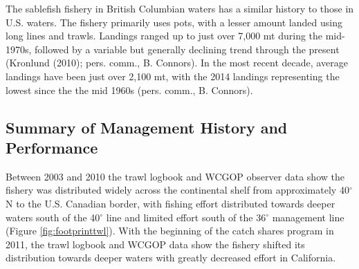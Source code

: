 \documentclass[11pt,
  english,
  a4paper,
]{article}
\begin{document}

The sablefish fishery in British Columbian waters has a similar history to those in U.S. waters. The fishery primarily uses pots, with a lesser amount landed using long lines and trawls. Landings ranged up to just over 7,000 mt during the mid-1970s, followed by a variable but generally declining trend through the present ({Kronlund (2010)\leavevmode\tagmcend\tagstructend}; pers. comm., B. Connors). In the most recent decade, average landings have been just over 2,100 mt, with the 2014 landings representing the lowest since the the mid 1960s (pers. comm., B. Connors).

\leavevmode\tagmcend\tagstructend\par


\hypertarget{summary-of-management-history-and-performance}{%
\subsection{Summary of Management History and Performance}\label{summary-of-management-history-and-performance}}

\leavevmode\tagmcend\tagstructend


Between 2003 and 2010 the trawl logbook and WCGOP observer data show the fishery was distributed widely across the continental shelf from approximately 40{\(^{\circ}\)\leavevmode\tagmcend\tagstructend}N to the U.S. Canadian border, with fishing effort distributed towards deeper waters south of the 40{\(^{\circ}\)\leavevmode\tagmcend\tagstructend} line and limited effort south of the 36{\(^{\circ}\)\leavevmode\tagmcend\tagstructend} management line (Figure \ref{fig:footprinttwl}). With the beginning of the catch shares program in 2011, the trawl logbook and WCGOP data show the fishery shifted its distribution towards deeper waters with greatly decreased effort in California.
\end{document}
